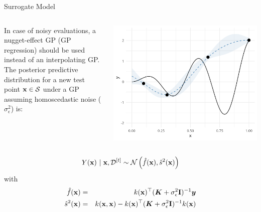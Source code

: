 \documentclass[11pt,compress,t,notes=noshow, xcolor=table]{beamer}
\begin{document}
\begin{vbframe}{Surrogate Model}

\begin{columns}[T]
\begin{column}{0.5\textwidth}
In case of noisy evaluations, a nugget-effect GP (GP regression) should be used instead of an interpolating GP.\\
\vspace{1em}
The posterior predictive distribution for a new test point $\mathbf{x} \in \mathcal{S}$ under a GP assuming homoscedastic noise ($\sigma_{\epsilon}^{2}$) is:
\end{column}
\begin{column}{0.5\textwidth}
\includegraphics[width = \textwidth]{figure_man/noisy_2.png}
\end{column}
\end{columns}

\vfill
\begin{eqnarray*}
  Y(\mathbf{x}) ~|~ \mathbf{x}, \mathcal{D}^{[t]} \sim \mathcal{N}\left(\hat{f}(\mathbf{x}), \hat{s}^2(\mathbf{x})\right)
\end{eqnarray*}
with 
\begin{eqnarray*}
  \hat{f}(\mathbf{x}) &=& k(\mathbf{x})^\top (\bm{K} + \sigma_{\epsilon}^{2}\mathbf{I})^{-1} \bm{y} \\
  \hat{s}^2(\mathbf{x}) &=& k(\mathbf{x}, \mathbf{x}) - k(\mathbf{x})^\top (\bm{K} + \sigma_{\epsilon}^{2}\mathbf{I})^{-1} k(\mathbf{x})
\end{eqnarray*}

\end{vbframe}
\end{document}
